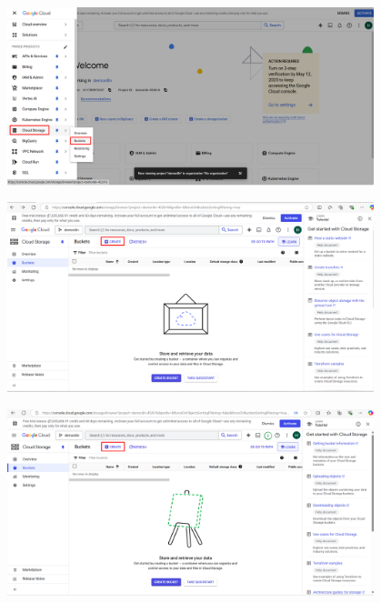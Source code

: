 \begin{itemize}[label=]
\begin{figure}[H]
    \end{figure}
    \begin{figure}[H]
    \centering
    \includegraphics[width=0.95\textwidth]{images/GGcloud-3.png}

    \end{figure}
    \begin{figure}[H]
    \centering
    \includegraphics[width=0.95\textwidth]{images/GGcloud-4.png}
    
    \end{figure}
    \begin{figure}[H]
    \centering
    \includegraphics[width=0.95\textwidth]{images/GGcloud-5.png}
    

\end{figure}
\end{itemize}
